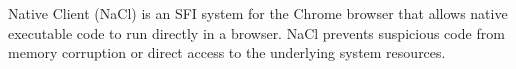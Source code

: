 %
Native Client (NaCl) \cite{NaCl-09} is an SFI system for the
Chrome browser that allows native executable code to run directly in a
browser. NaCl prevents suspicious code
from memory corruption or direct access to the underlying system
resources.

%
